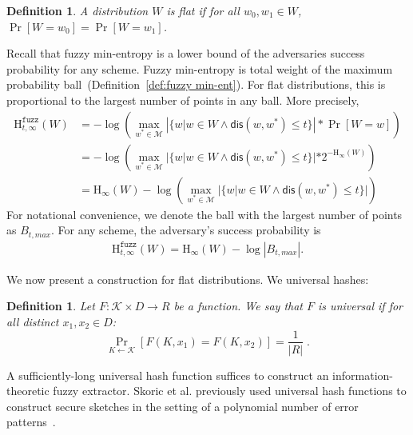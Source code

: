 \documentclass[11pt]{article}
\newcommand{\defref}[1]{\mbox{Definition~\ref{#1}}}
\newcommand{\dis}{\ensuremath{\mathsf{dis}}}
\newcommand{\Hoo}{\mathrm{H}_\infty}
\newcommand{\Hfuzz}{\mathrm{H}^{\mathtt{fuzz}}_{t,\infty}}
\newtheorem{definition}[theorem]{Definition}
\begin{document}
\begin{definition}
A distribution $W$ is \emph{flat} if for all $w_0, w_1 \in W$, $\Pr[W=w_0] = \Pr[W=w_1]$.  
\end{definition}

Recall that fuzzy min-entropy is a lower bound of the adversaries success probability for any scheme.  Fuzzy min-entropy is total weight of the maximum probability ball~(\defref{def:fuzzy min-ent}).  For flat distributions, this is proportional to the largest number of points in any ball.  More precisely, 
\begin{align*}
\Hfuzz(W) &= -\log \left(\max_{w^* \in \mathcal{M}} \left| \{w | w\in W \wedge \dis(w, w^*)\le t\} \right|* \Pr[W=w]\right) \\
&= -\log\left( \max_{w^* \in \mathcal{M}} |\{w | w\in W \wedge \dis(w, w^*)\le t\}| *2^{-\Hoo(W)}\right) \\
&=\Hoo(W) -\log\left( \max_{w^* \in \mathcal{M}}| \{w | w\in W \wedge \dis(w, w^*)\le t\} |\right)
\end{align*}
For notational convenience, we denote the ball with the largest number of points as $B_{t, max}$.  For any scheme, the adversary's success probability is 
\begin{align}
\Hfuzz(W) = \Hoo(W) -\log |B_{t, max}|.\label{eq:fuzz for flat}
\end{align}

We now present a construction for flat distributions.  We universal hashes:

\begin{definition}
Let $F : \mathcal{K} \times D \to R$ be a function.  We say that $F$ is \emph{universal} if for all distinct $x_1, x_2 \in D$:
\[
 \Pr_{K \leftarrow \mathcal{K}}[F(K, x_1) = F(K, x_2)] = \frac{1}{|R|} \;.
\]
\end{definition}

A sufficiently-long universal hash function suffices to construct an information-theoretic fuzzy extractor.  Skoric et al. previously used universal hash functions to construct secure sketches in the setting of a polynomial number of error patterns~\cite{skoric2009efficient}.
\end{document}

